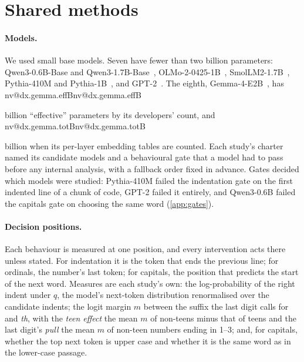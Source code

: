 \documentclass[11pt]{article}
\makeatletter
\newcommand{\nv}[1]{\ifcsname nv@#1\endcsname\csname nv@#1\endcsname\else\PackageError{numbers}{Unknown number key #1}{}\fi}
\newcommand{\sfx}[1]{\textit{#1}}
\newcommand{\qsix}{Qwen3-0.6B-Base}
\newcommand{\qbig}{Qwen3-1.7B-Base}
\newcommand{\olmo}{OLMo-2-0425-1B}
\newcommand{\gm}{Gemma-4-E2B}
\makeatother
\begin{document}
\section{Shared methods}
\label{sec:methods}

\paragraph{Models.} We used small base models. Seven have fewer than two billion parameters: \qsix{} and \qbig{}~\citep{qwen2025qwen3}, \olmo{}~\citep{olmo2024olmo2}, SmolLM2-1.7B~\citep{benallal2025smollm2}, Pythia-410M and Pythia-1B~\citep{biderman2023pythia}, and GPT-2~\citep{radford2019language}. The eighth, \gm{}~\citep{gemma2026gemma4}, has \nv{dx.gemma.effB} billion ``effective'' parameters by its developers' count, and \nv{dx.gemma.totB} billion when its per-layer embedding tables are counted. Each study's charter named its candidate models and a behavioural gate that a model had to pass before any internal analysis, with a fallback order fixed in advance. Gates decided which models were studied: Pythia-410M failed the indentation gate on the first indented line of a chunk of code, GPT-2 failed it entirely, and Qwen3-0.6B failed the capitals gate on choosing the same word (\cref{app:gates}).

\paragraph{Decision positions.} Each behaviour is measured at one position, and every intervention acts there unless stated. For indentation it is the token that ends the previous line; for ordinals, the number's last token; for capitals, the position that predicts the start of the next word. Measures are each study's own: the log-probability of the right indent under $q$, the model's next-token distribution renormalised over the candidate indents; the logit margin $m$ between the suffix the last digit calls for and \sfx{th}, with the \emph{teen effect} the mean $m$ of non-teens minus that of teens and the last digit's \emph{pull} the mean $m$ of non-teen numbers ending in 1--3; and, for capitals, whether the top next token is upper case and whether it is the same word as in the lower-case passage.
\end{document}
